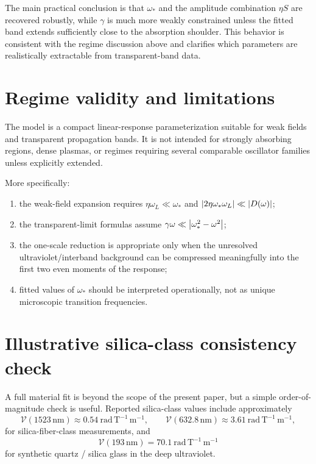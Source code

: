 \documentclass[11pt,a4paper]{article}
\begin{document}
    The main practical conclusion is that $\omega_\ast$ and the amplitude combination $\eta S$ are recovered robustly, while $\gamma$ is much more weakly constrained unless the fitted band extends sufficiently close to the absorption shoulder. This behavior is consistent with the regime discussion above and clarifies which parameters are realistically extractable from transparent-band data.
    
    \section{Regime validity and limitations}
    
    The model is a compact linear-response parameterization suitable for weak fields and transparent propagation bands. It is not intended for strongly absorbing regions, dense plasmas, or regimes requiring several comparable oscillator families unless explicitly extended.
    
    More specifically:
    \begin{enumerate}
        \item the weak-field expansion requires $\eta\omega_L\ll \omega_\ast$ and $\abs{2\eta\omega_\ast\omega_L}\ll \abs{D(\omega)}$;
        \item the transparent-limit formulas assume $\gamma\omega\ll\abs{\omega_\ast^2-\omega^2}$;
        \item the one-scale reduction is appropriate only when the unresolved ultraviolet/interband background can be compressed meaningfully into the first two even moments of the response;
        \item fitted values of $\omega_\ast$ should be interpreted operationally, not as unique microscopic transition frequencies.
    \end{enumerate}
    
    \section{Illustrative silica-class consistency check}
    \label{sec:silica_check}
    
    A full material fit is beyond the scope of the present paper, but a simple order-of-magnitude check is useful. Reported silica-class values include approximately
    \[
    \mathcal{V}(1523\,\mathrm{nm}) \approx 0.54\ \mathrm{rad\,T^{-1}\,m^{-1}},
    \qquad
    \mathcal{V}(632.8\,\mathrm{nm}) \approx 3.61\ \mathrm{rad\,T^{-1}\,m^{-1}},
    \]
    for silica-fiber-class measurements, and
    \[
    \mathcal{V}(193\,\mathrm{nm}) = 70.1\ \mathrm{rad\,T^{-1}\,m^{-1}}
    \]
    for synthetic quartz / silica glass in the deep ultraviolet.
    
\end{document}
